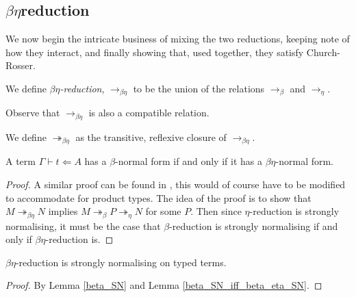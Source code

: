 
\subsection{\texorpdfstring{$\beta \eta$}-reduction}

We now begin the intricate business of mixing the two reductions, keeping note of how they interact, and finally showing that, used together, they satisfy Church-Rosser.

\begin{defin}\label{beta_eta_reduction}
    We define \emph{$\beta\eta$-reduction}, $\to_{\beta\eta}$ to be the union of the relations $\to_\beta$ and $\to_\eta$.
\end{defin}

\begin{remark}
    Observe that $\to_{\beta\eta}$ is also a compatible relation.
\end{remark}

\begin{defin}
    We define $\twoheadrightarrow_{\beta\eta}$ as the transitive, reflexive closure of $\to_{\beta\eta}$.
\end{defin}

\begin{lemma}\label{beta_SN_iff_beta_eta_SN}
    A term $\Gamma \vdash t \Leftarrow A$ has a $\beta$-normal form if and only if it has a $\beta \eta$-normal form.
\end{lemma}

\begin{proof}
    A similar proof can be found in \cite[Corollary 15.1.5]{barendregt1984lambda}, this would of course have to be modified to accommodate for product types. The idea of the proof is to show that $M \twoheadrightarrow_{\beta\eta} N$ implies $M \twoheadrightarrow_{\beta} P \twoheadrightarrow_{\eta} N$ for some $P$. Then since $\eta$-reduction is strongly normalising, it must be the case that $\beta$-reduction is strongly normalising if and only if $\beta \eta$-reduction is.
\end{proof}

\begin{cor}\label{beta_eta_SN}
    $\beta \eta$-reduction is strongly normalising on typed terms.
\end{cor}

\begin{proof}
    By Lemma \ref{beta_SN} and Lemma \ref{beta_SN_iff_beta_eta_SN}.
\end{proof}

